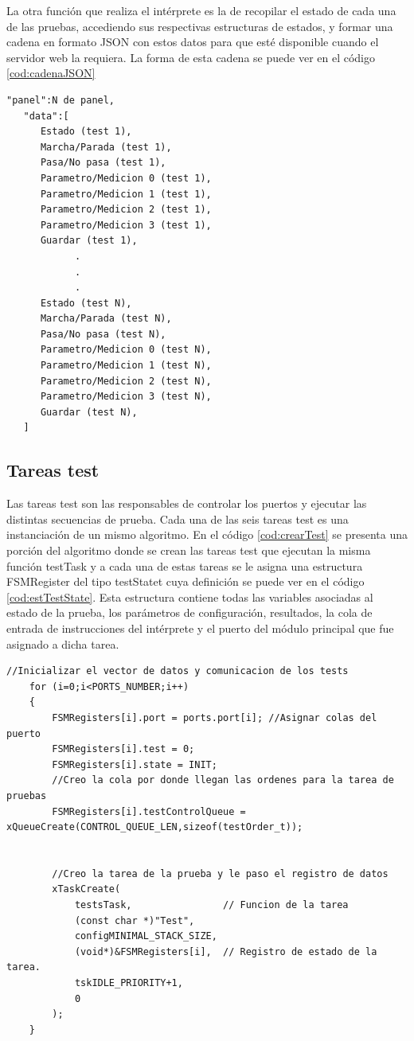 La otra función que realiza el intérprete es la de recopilar el estado de cada una de las pruebas, accediendo sus respectivas estructuras de estados, y formar una cadena en formato JSON con estos datos para que esté disponible cuando el servidor web la requiera.
La forma de esta cadena se puede ver en el código \ref{cod:cadenaJSON}

\begin{lstlisting}[label=cod:cadenaJSON, caption= Cadena de datos de panel en notación JSON.]
   "panel":N de panel,
   "data":[
      Estado (test 1),
      Marcha/Parada (test 1),
      Pasa/No pasa (test 1),
      Parametro/Medicion 0 (test 1),
      Parametro/Medicion 1 (test 1),
      Parametro/Medicion 2 (test 1),
      Parametro/Medicion 3 (test 1),
      Guardar (test 1),
			.
			.
			.
      Estado (test N),
      Marcha/Parada (test N),
      Pasa/No pasa (test N),
      Parametro/Medicion 0 (test N),
      Parametro/Medicion 1 (test N),
      Parametro/Medicion 2 (test N),
      Parametro/Medicion 3 (test N),
      Guardar (test N),
   ]

\end{lstlisting}


\subsection{Tareas test}

Las tareas test son las responsables de controlar los puertos y ejecutar las distintas secuencias de prueba. Cada una de las seis tareas test es una instanciación de un mismo algoritmo. En el código \ref{cod:crearTest} se presenta una porción del algoritmo donde se crean las tareas test que ejecutan la misma función testTask y a cada una de estas tareas se le asigna una estructura FSMRegister del tipo testStatet cuya definición se puede ver en el código \ref{cod:estTestState}.
Esta estructura contiene todas las variables asociadas al estado de la prueba, los parámetros de configuración, resultados, la cola de entrada de instrucciones del intérprete y el puerto del módulo principal que fue asignado a dicha tarea.


\begin{lstlisting}[label=cod:crearTest, caption= Algoritmo de creación de tareas test.]
//Inicializar el vector de datos y comunicacion de los tests
	for (i=0;i<PORTS_NUMBER;i++)
	{
		FSMRegisters[i].port = ports.port[i]; //Asignar colas del puerto
		FSMRegisters[i].test = 0;
		FSMRegisters[i].state = INIT;
		//Creo la cola por donde llegan las ordenes para la tarea de pruebas
		FSMRegisters[i].testControlQueue = xQueueCreate(CONTROL_QUEUE_LEN,sizeof(testOrder_t)); 


		//Creo la tarea de la prueba y le paso el registro de datos
		xTaskCreate(
			testsTask,                // Funcion de la tarea
			(const char *)"Test",     
			configMINIMAL_STACK_SIZE, 
			(void*)&FSMRegisters[i],  // Registro de estado de la tarea.
			tskIDLE_PRIORITY+1,         
			0                           
		);
	}


\end{lstlisting}

